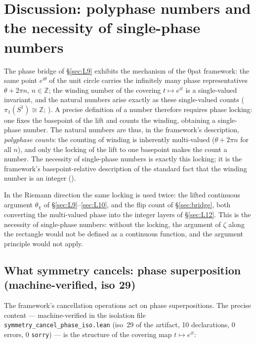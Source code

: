 \documentclass{article}
\newcommand{\Z}{\mathbb{Z}}
\newcommand{\zt}{\zeta}
\newcommand{\Xchi}{\chi}
\begin{document}
\section{Discussion: polyphase numbers and the necessity of single-phase numbers}
\label{sec:discussion}

The phase bridge of \S\ref{sec:L9} exhibits the mechanism of the 0pat
framework: the same point $e^{i\theta}$ of the unit circle carries the
infinitely many phase representatives $\theta+2\pi n$, $n\in\Z$; the winding
number of the covering $t\mapsto e^{it}$ is a single-valued invariant, and
the natural numbers arise exactly as these single-valued counts
($\pi_1(S^1)\cong\Z$; \cite{hatcher}). A precise definition of a number
therefore requires phase locking: one fixes the basepoint of the lift and
counts the winding, obtaining a single-phase number. The natural numbers
are thus, in the framework's description, \emph{polyphase counts}: the
counting of winding is inherently multi-valued ($\theta+2\pi n$ for all
$n$), and only the locking of the lift to one basepoint makes the count a
number. The necessity of single-phase numbers is exactly this locking; it
is the framework's basepoint-relative description of the standard fact
that the winding number is an integer (\cite{patbase}).

In the Riemann direction the same locking is used twice: the lifted
continuous argument $\theta_\Xchi$ of \S\ref{sec:L9}--\ref{sec:L10}, and
the flip count of \S\ref{sec:bridge}, both converting the multi-valued
phase into the integer layers of \S\ref{sec:L12}. This is the necessity of
single-phase numbers: without the locking, the argument of $\zt$ along the
rectangle would not be defined as a continuous function, and the argument
principle would not apply.

\subsection*{What symmetry cancels: phase superposition (machine-verified, iso 29)}

The framework's cancellation operations act on phase superpositions. The
precise content --- machine-verified in the isolation file
\texttt{symmetry\_cancel\_phase\_iso.lean} (iso~29 of the artifact, 10
declarations, 0 errors, 0 \texttt{sorry}) --- is the structure of the
covering map $t\mapsto e^{it}$:
\end{document}
